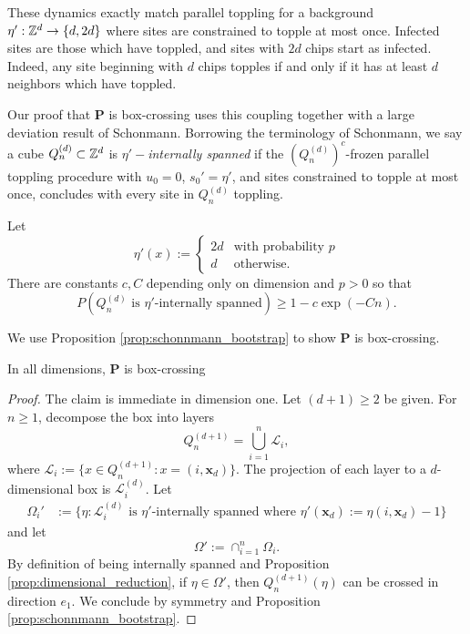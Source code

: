 \documentclass[12pt]{amsart}
\begin{document}
These dynamics exactly match parallel toppling for a background $\eta':\mathbb{Z}^d \to \{d, 2 d\}$
where sites are constrained to topple at most once.
Infected sites are those which have toppled, and sites with $2 d$ chips start as infected. Indeed, any 
site beginning with $d$ chips topples if and only if it has at least $d$ neighbors which have toppled.


Our proof that $\mathbf{P}$ is box-crossing uses this coupling together with a large deviation result of Schonmann. Borrowing the terminology of Schonmann, we say a cube $Q_n^{(d)} \subset \mathbb{Z}^d$ is $\eta'-${\it internally spanned}
if the $(Q_n^{(d)})^c$-frozen parallel toppling procedure with $u_0 = 0$, $s_0' = \eta'$, and sites constrained to topple at most once, concludes with every site in $Q_n^{(d)}$ toppling. 




\begin{prop} \label{prop:schonnmann_bootstrap}
	Let
	\[
	\eta'(x) := \begin{cases} 2 d &\mbox{with probability $p$} \\
	d &\mbox{otherwise.}
	\end{cases}
	\]
	There are constants $c,C$ depending only on dimension and $p > 0$
	so that 
	\begin{equation}
	P(\mbox{$Q_n^{(d)}$ is $\eta'$-internally spanned}) \geq 1 -  c \exp(-C n).
	\end{equation}
\end{prop}


We use Proposition \ref{prop:schonnmann_bootstrap} to show $\mathbf{P}$ is box-crossing. 

\begin{prop}
	In all dimensions, $\mathbf{P}$ is box-crossing
\end{prop}
\begin{proof}
	The claim is immediate in dimension one.
	Let $(d+1) \geq 2$ be given. For $n \geq 1$, decompose the box into layers
	\[
	Q_n^{(d+1)} = \bigcup_{i=1}^{n} \mathcal{L}_i,
	\]
	where $\mathcal{L}_i := \{ x \in Q_n^{(d+1)} : x = (i, \mathbf{x}_d)\}$.
	The projection of each layer to a $d$-dimensional box is $\mathcal{L}_i^{(d)}$. Let 
	\begin{align*}
	\Omega_i' &:= \{\eta : \mbox{$\mathcal{L}_i^{(d)}$ is $\eta'$-internally spanned where $\eta'(\mathbf{x}_d) := \eta(i, \mathbf{x}_d) - 1$} \}
	\end{align*}
	and let 
	\[
	\Omega'  := \cap_{i=1}^n \Omega_i. 
	\]
	By definition of being internally spanned and Proposition \ref{prop:dimensional_reduction}, if $\eta \in \Omega'$, 
	then $Q_n^{(d+1)}(\eta)$ can be crossed in direction $e_1$. We conclude by symmetry and Proposition \ref{prop:schonnmann_bootstrap}.
	
\end{proof}

{}

\end{document}

